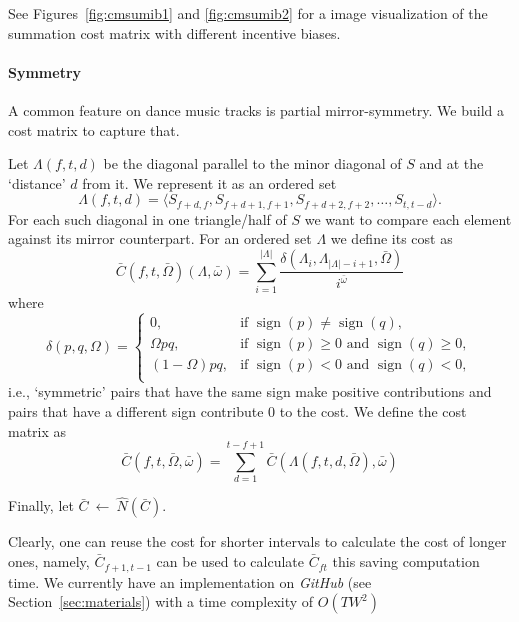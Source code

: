\documentclass[twocolumn]{article}
\newcommand{\sign}{\mathop{\mathrm{sign}}}
\begin{document}
	See Figures~\ref{fig:cmsumib1} and \ref{fig:cmsumib2} for a image visualization of the summation cost matrix with different incentive biases.
	
	\paragraph{Symmetry}	
	
A common feature on dance music tracks is partial mirror-symmetry. We build a cost matrix to capture that.
	
Let $\Lambda(f,t,d)$ be the diagonal parallel to the minor diagonal
of $S$ and at the `distance' $d$ from it. We represent it as an ordered set
\begin{dmath*}
\Lambda(f,t,d)
 = \langle S_{f+d,f}, S_{f+d+1, f+1}, S_{f+d+2, f+2},\ldots, S_{t, t-d}\rangle.
	\end{dmath*} 
For each such diagonal in one triangle/half of $S$ we want to compare
each element against its mirror counterpart. For an ordered set
$\Lambda$ we define its cost as
\begin{dmath*}
\bar C(f,t,\bar \Omega)(\Lambda, \bar \omega)=\sum_{i=1}^{|\Lambda|} \frac{ \delta(\Lambda_i,\Lambda_{|\Lambda|-i+1},\bar \Omega)}{i^{\bar \omega}}
\end{dmath*}
where
\begin{dmath*}
\delta(p,q,\Omega) = 
\left\{\begin{array}{ll}
0,  & \text{if~}\sign( p ) \ne \sign( q ),\\
\Omega pq,   & \text{if~}  \sign(p) \ge 0 \text{~and~} \sign(q) \ge 0 ,  \\
(1-\Omega)pq,  & \text{if~} \sign(p) < 0 \text{~and~} \sign(q) < 0, \\
\end{array}\right.
\end{dmath*}
i.e., `symmetric' pairs that have the same sign make positive
contributions and pairs that have a different sign contribute $0$ to
the cost. We define the cost matrix as
\begin{dmath*}
\bar C(f,t,\bar \Omega, \bar \omega) = \sum_{d=1}^{t-f+1}\bar C(\Lambda(f,t,d,\bar \Omega), \bar \omega)
\end{dmath*}

Finally, let $\bar C~\leftarrow~\hat N(\bar C)$.

Clearly, one can reuse the cost for shorter intervals to calculate the
cost of longer ones, namely, $\bar C_{f+1,t-1}$ can be used to
calculate $\bar C_{ft}$ this saving computation time. We currently have an implementation on \textit{GitHub} (see Section~\ref{sec:materials}) with a time complexity of $O(TW^2)$
\end{document}
